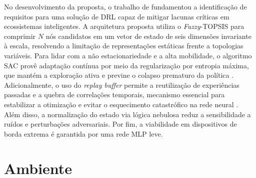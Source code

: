 No desenvolvimento da proposta, o trabalho de \cite{miriyala2026} fundamentou a identificação de requisitos para uma solução de \gls{DRL} capaz de mitigar lacunas críticas em ecossistemas inteligentes. A arquitetura proposta utiliza o \textit{Fuzzy}-\gls{TOPSIS} para comprimir $N$ nós candidatos em um vetor de estado de seis dimensões invariante à escala, resolvendo a limitação de representações estáticas frente a topologias variáveis. Para lidar com a não estacionariedade e a alta mobilidade, o algoritmo \gls{SAC} provê adaptação contínua por meio da regularização por entropia máxima, que mantém a exploração ativa e previne o colapso prematuro da política \cite{haarnoja2018sac}. Adicionalmente, o uso do \textit{replay buffer} permite a reutilização de experiências passadas e a quebra de correlações temporais, mecanismo essencial para estabilizar a otimização e evitar o esquecimento catastrófico na rede neural \cite{mnih2015}. Além disso, a normalização do estado via lógica nebulosa reduz a sensibilidade a ruídos e perturbações adversariais. Por fim, a viabilidade em dispositivos de borda extrema é garantida por uma rede MLP leve.

\section{Ambiente}
\label{sec:ambiente}

